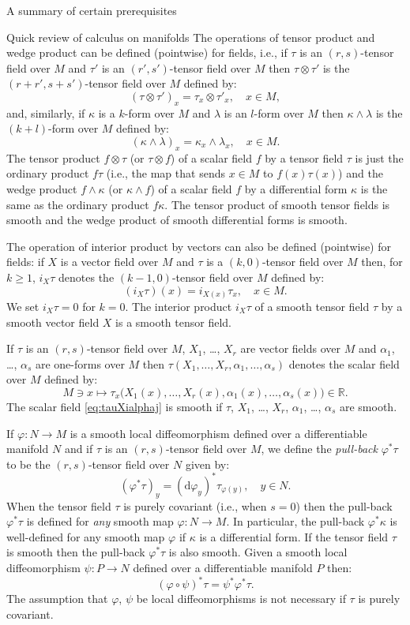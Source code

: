 \documentclass[oneside,a4paper,11pt]{amsbook}
\newcommand{\R}{\mathds R}
\newcommand{\dd}{\mathrm d}
\theoremstyle{remark}\newtheorem{exercise}{Exercise}[chapter]
\theoremstyle{plain}\newtheorem{teo}{Theorem}[section]
\theoremstyle{plain}\newtheorem{lem}[teo]{Lemma}
\theoremstyle{plain}\newtheorem{prop}[teo]{Proposition}
\theoremstyle{plain}\newtheorem{cor}[teo]{Corollary}
\theoremstyle{definition}\newtheorem{defin}[teo]{Definition}
\theoremstyle{remark}\newtheorem{rem}[teo]{Remark}
\theoremstyle{definition}\newtheorem{notation}[teo]{Notation}
\theoremstyle{definition}\newtheorem{convention}[teo]{Convention}
\theoremstyle{definition}\newtheorem{example}[teo]{Example}
\numberwithin{section}{chapter}
\numberwithin{equation}{section}
\begin{document}
\begin{chapter}{A summary of certain prerequisites}
\begin{section}{Quick review of calculus on manifolds}
The operations of tensor product and wedge product can be defined (pointwise)
for fields, i.e., if $\tau$ is an $(r,s)$-tensor field over $M$ and $\tau'$ is an $(r',s')$-tensor field over $M$ then
$\tau\otimes\tau'$ is the $(r+r',s+s')$-tensor field over $M$ defined by:
\[(\tau\otimes\tau')_x=\tau_x\otimes\tau'_x,\quad x\in M,\]
and, similarly, if $\kappa$ is a $k$-form over $M$ and $\lambda$ is an $l$-form over $M$ then
$\kappa\wedge\lambda$ is the $(k+l)$-form over $M$ defined by:
\[(\kappa\wedge\lambda)_x=\kappa_x\wedge\lambda_x,\quad x\in M.\]
The tensor product $f\otimes\tau$ (or $\tau\otimes f$) of a scalar field $f$ by a tensor field $\tau$ is just
the ordinary product $f\tau$ (i.e., the map that sends $x\in M$ to $f(x)\tau(x)$) and the wedge product $f\wedge\kappa$
(or $\kappa\wedge f$) of a scalar field $f$ by a differential form $\kappa$ is the same as the ordinary product
$f\kappa$. The tensor product of smooth tensor fields is smooth and the wedge product of smooth differential forms is smooth.

The operation of interior product by vectors can also be defined (pointwise) for fields: if $X$ is a vector field
over $M$ and $\tau$ is a $(k,0)$-tensor field over $M$ then, for $k\ge1$, $i_X\tau$ denotes the $(k-1,0)$-tensor field over $M$
defined by:
\[(i_X\tau)(x)=i_{X(x)}\tau_x,\quad x\in M.\]
We set $i_X\tau=0$ for $k=0$. The interior product $i_X\tau$ of a smooth tensor field $\tau$ by a smooth vector field $X$ is a smooth tensor field.

If $\tau$ is an $(r,s)$-tensor field over $M$, $X_1$, \dots, $X_r$ are vector fields over $M$ and $\alpha_1$, \dots,
$\alpha_s$ are one-forms over $M$ then $\tau(X_1,\ldots,X_r,\alpha_1,\ldots,\alpha_s)$ denotes the scalar field
over $M$ defined by:
\begin{equation}\label{eq:tauXialphaj}
M\ni x\longmapsto\tau_x\big(X_1(x),\ldots,X_r(x),\alpha_1(x),\ldots,\alpha_s(x)\big)\in\R.
\end{equation}
The scalar field \eqref{eq:tauXialphaj} is smooth if $\tau$, $X_1$, \dots, $X_r$, $\alpha_1$, \dots, $\alpha_s$ are smooth.

If $\varphi:N\to M$ is a smooth local diffeomorphism defined over a differentiable manifold $N$ and if $\tau$ is an
$(r,s)$-tensor field over $M$, we define the {\em pull-back\/} $\varphi^*\tau$ to be the $(r,s)$-tensor field over $N$ given by:
\[(\varphi^*\tau)_y=(\dd\varphi_y)^*\tau_{\varphi(y)},\quad y\in N.\]
When the tensor field $\tau$ is purely covariant (i.e., when $s=0$) then the pull-back $\varphi^*\tau$ is defined for {\em any\/} smooth map $\varphi:N\to M$.
In particular, the pull-back $\varphi^*\kappa$ is well-defined for any smooth map $\varphi$ if $\kappa$ is a differential form. If the tensor field $\tau$ is smooth
then the pull-back $\varphi^*\tau$ is also smooth.
Given a smooth local diffeomorphism $\psi:P\to N$ defined over a differentiable manifold $P$ then:
\[(\varphi\circ\psi)^*\tau=\psi^*\varphi^*\tau.\]
The assumption that $\varphi$, $\psi$ be local diffeomorphisms is not necessary if $\tau$ is purely covariant.


\end{section}
\end{chapter}
\end{document}

